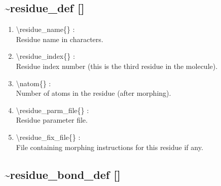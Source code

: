 \documentclass[12pt,titlepage]{article}
\begin{document}
\newpage
\subsection*{\bf \~{ }residue\_def []}

\begin{enumerate}

 \vspace{0.15in} 
 \item  \textbackslash{}residue\_name\{\} : \\ 
    Residue name in characters.

 \vspace{0.15in} 
 \item  \textbackslash{}residue\_index\{\} : \\ 
    Residue index number (this is the third residue in the molecule).

 \vspace{0.15in} 
 \item  \textbackslash{}natom\{\} : \\ 
    Number of atoms in the residue (after morphing).

 \vspace{0.15in} 
 \item  \textbackslash{}residue\_parm\_file\{\} : \\ 
    Residue parameter file.

 \vspace{0.15in} 
 \item  \textbackslash{}residue\_fix\_file\{\} : \\ 
    File containing morphing instructions for this residue if any.

\end{enumerate}

\newpage
\subsection*{\bf \~{ }residue\_bond\_def []}
\end{document}
